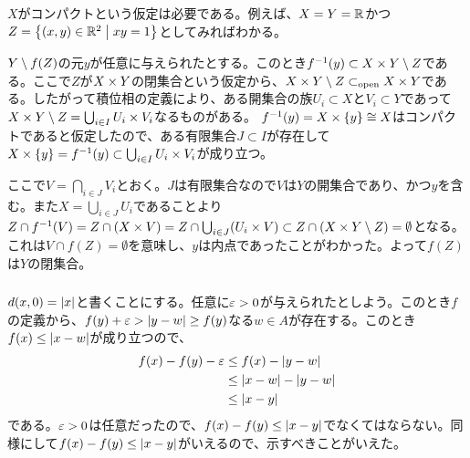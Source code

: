 \subsubsection{} %
\begin{rem}
  $X$がコンパクトという仮定は必要である。例えば、$X=Y={\mathbb R}$かつ$Z=\left\{ (x,y) \in {\mathbb R}^2 \mathrel{} \middle| \mathrel{} xy=1 \right\}$としてみればわかる。
\end{rem}
\begin{sol}
$Y \setminus f(Z)$の元$y$が任意に与えられたとする。このとき$f^{-1}(y) \subset X \times Y \setminus Z$である。ここで$Z$が$X\times Y$の閉集合という仮定から、$X \times Y \setminus Z \subset_{\text{open}} X \times Y$である。したがって積位相の定義により、ある開集合の族$U_i \subset X$と$V_i \subset Y$であって$X \times Y \setminus Z = \bigcup_{i \in I} U_i \times V_i$なるものがある。
$f^{-1}(y) = X \times \{ y \} \cong X$はコンパクトであると仮定したので、ある有限集合$J \subset I$が存在して$X \times \{y\} = f^{-1}(y) \subset \bigcup_{i \in I} U_i \times V_i$が成り立つ。

ここで$V = \bigcap_{i \in J} V_i$とおく。$J$は有限集合なので$V$は$Y$の開集合であり、かつ$y$を含む。また$X = \bigcup_{i \in J} U_i$であることより$Z \cap f^{-1}(V) = Z \cap (X \times V) = Z \cap \bigcup_{i \in J} (U_i \times V) \subset Z \cap (X \times Y \setminus Z) = \emptyset$となる。
これは$V \cap f(Z) = \emptyset$を意味し、$y$は内点であったことがわかった。よって$f(Z)$は$Y$の閉集合。
\end{sol}


\newpage

\subsubsection{} %
\begin{sol}
  $d(x,0) = \left \lvert x \right \rvert$と書くことにする。任意に${\varepsilon} > 0$が与えられたとしよう。このとき$f$の定義から、$f(y) + {\varepsilon} > \left \lvert y-w \right \rvert \geq f(y)$なる$w \in A$が存在する。このとき$f(x) \leq \left \lvert x-w \right \rvert$が成り立つので、
  \begin{align*}
    f(x) - f(y) - {\varepsilon} &\leq f(x) - \left \lvert y-w \right \rvert \\
    &\leq \left \lvert x-w \right \rvert - \left \lvert y-w \right \rvert \\
    &\leq \left \lvert x-y \right \rvert
  \end{align*}
  である。${\varepsilon} > 0$は任意だったので、$f(x) - f(y) \leq \left \lvert x-y \right \rvert$でなくてはならない。同様にして$f(x) - f(y) \leq \left \lvert x-y \right \rvert$がいえるので、示すべきことがいえた。
\end{sol}

